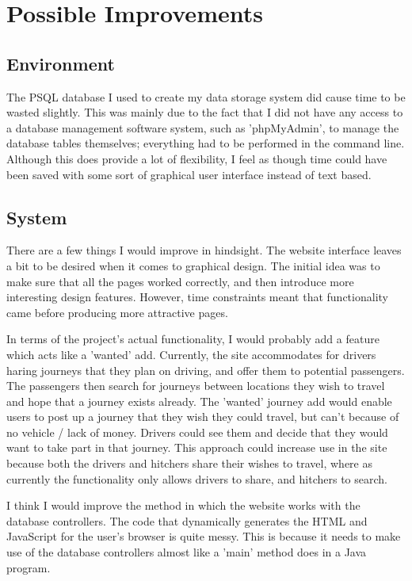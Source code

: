\section{Possible Improvements}
\subsection{Environment}
The PSQL database I used to create my data storage system did cause time to be wasted slightly. This was mainly due to the fact that I did not have any access to a database management software system, such as 'phpMyAdmin'\cite{php_my_admin}, to manage the database tables themselves; everything had to be performed in the command line. Although this does provide a lot of flexibility, I feel as though time could have been saved with some sort of graphical user interface instead of text based.

\subsection{System}
There are a few things I would improve in hindsight. The website interface leaves a bit to be desired when it comes to graphical design. The initial idea was to make sure that all the pages worked correctly, and then introduce more interesting design features. However, time constraints meant that functionality came before producing more attractive pages.

In terms of the project's actual functionality, I would probably add a feature which acts like a 'wanted' add. Currently, the site accommodates for drivers haring journeys that they plan on driving, and offer them to potential passengers. The passengers then search for journeys between locations they wish to travel and hope that a journey exists already. The 'wanted' journey add would enable users to post up a journey that they wish they could travel, but can't because of no vehicle / lack of money. Drivers could see them and decide that they would want to take part in that journey. This approach could increase use in the site because both the drivers and hitchers share their wishes to travel, where as currently the functionality only allows drivers to share, and hitchers to search.

I think I would improve the method in which the website works with the database controllers. The code that dynamically generates the HTML and JavaScript for the user's browser is quite messy. This is because it needs to make use of the database controllers almost like a 'main' method does in a Java program. 

